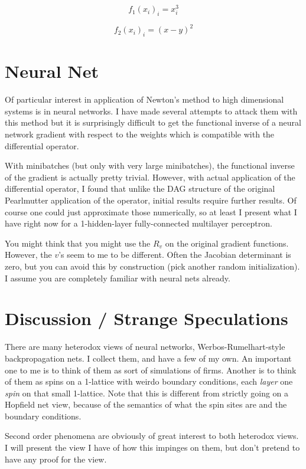 \documentclass{article}
\begin{document}
$$ f_1(x_i)_i = x_i^3 $$


$$ f_2(x_i)_i = (x -y) ^ 2 $$

\section{Neural Net}

Of particular interest in application of Newton's method to high dimensional systems is in neural networks. I have made several attempts to attack them with this method but it is surprisingly difficult to get the functional inverse of a neural network gradient with respect to the weights which is compatible with the differential operator.

With minibatches (but only with very large minibatches), the functional inverse of the gradient is actually pretty trivial. However, with actual application of the differential operator, I found that unlike the DAG structure of the original Pearlmutter application of the operator, initial results require further results. Of course one could just approximate those numerically, so at least I present what I have right now for a 1-hidden-layer fully-connected multilayer perceptron.

You might think that you might use the $R_v$ on the original gradient functions. However, the $v$'s seem to me to be different. Often the Jacobian determinant is zero, but you can avoid this by construction (pick another random initialization). I assume you are completely familiar with neural nets already.


\section{Discussion / Strange Speculations}

There are many heterodox views of neural networks, Werbos-Rumelhart-style backpropagation nets. I collect them, and have a few of my own. An important one to me is to think of them as sort of simulations of firms. Another is to think of them as spins on a 1-lattice with weirdo boundary conditions, each \textit{layer} one \textit{spin} on that small 1-lattice. Note that this is different from strictly going on a Hopfield net view, because of the semantics of what the spin sites are and the boundary conditions.

Second order phenomena are obviously of great interest to both heterodox views. I will present the view I have of how this impinges on them, but don't pretend to have any proof for the view.
\end{document}
